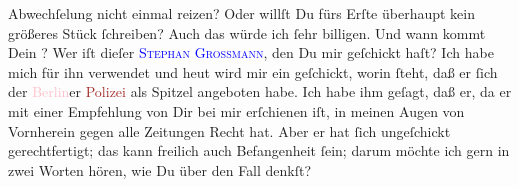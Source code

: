                Abwechſelung nicht einmal reizen? Oder willſt Du fürs Erſte überhaupt kein größeres
               Stück ſchreiben? Auch das würde ich ſehr billigen. Und wann kommt Dein \label{K_L02794-11v}\label{K_L02794-11h}?\pend
           \pstart
           Wer iſt dieſer \textsc{\textcolor{blue}{Stephan Grossmann}{}\ledrightnote{\textcolor{blue}{Stefan Großmann}}}, den Du mir geſchickt haſt? Ich habe mich für ihn verwendet und heut wird mir ein \label{K_L02794-12v}\label{K_L02794-12h} geſchickt, worin
               ſteht, daß {\pb}er ſich der \textcolor{pink}{Berlin}{}\ledrightnote{\textcolor{pink}{Berlin}}er \textcolor{brown}{Polizei}{} als Spitzel angeboten habe.  Ich habe ihm geſagt, daß er, da er mit einer Empfehlung von Dir bei mir
               erſchienen iſt,  in meinen Augen von Vornherein gegen alle Zeitungen Recht hat. Aber er hat
               ſich  ungeſchickt gerechtfertigt; das kann freilich auch Befangenheit ſein;  darum möchte ich gern in zwei Worten hören, wie Du über den Fall denkſt?\pend
           \pstart
